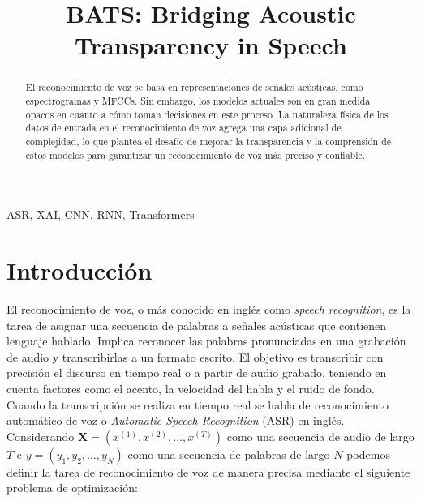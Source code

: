\documentclass[conference]{IEEEtran}
\begin{document}
\title{BATS: Bridging Acoustic Transparency in Speech}

\author{
\and
{}
}

\maketitle

\begin{abstract}

El reconocimiento de voz se basa en representaciones de señales acústicas, como espectrogramas y MFCCs. Sin embargo, los modelos actuales son en gran medida opacos en cuanto a cómo toman decisiones en este proceso. La naturaleza física de los datos de entrada en el reconocimiento de voz agrega una capa adicional de complejidad, lo que plantea el desafío de mejorar la transparencia y la comprensión de estos modelos para garantizar un reconocimiento de voz más preciso y confiable.

\end{abstract}

\begin{IEEEkeywords}
ASR, XAI, CNN, RNN, Transformers
\end{IEEEkeywords}

\section{Introducción}

El reconocimiento de voz, o más conocido en inglés como \textit{speech recognition}, es la tarea de asignar una secuencia de palabras a señales acústicas que contienen lenguaje hablado. 
Implica reconocer las palabras pronunciadas en una grabación de audio y transcribirlas a un formato escrito. El objetivo es transcribir con precisión el discurso en tiempo real o a partir de audio grabado, teniendo en cuenta factores como el acento, la velocidad del habla y el ruido de fondo.
Cuando la transcripción se realiza en tiempo real se habla de reconocimiento automático de voz o \textit{Automatic Speech Recognition} (ASR) en inglés. Considerando $\mathbf{X} = (x^{(1)}, x^{(2)} ,\dots, x^{(T)})$ como una secuencia de audio de largo $T$ e $y = (y_1, y_2, \dots, y_N)$ como una secuencia de palabras de largo $N$ podemos definir la tarea de reconocimiento de voz de manera precisa mediante el siguiente problema de optimización:
\end{document}

